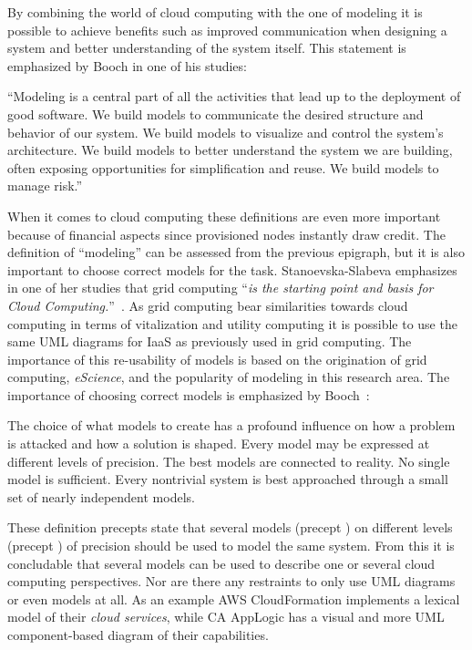 By combining the world of cloud computing with the one of modeling 
it is possible to achieve benefits such as improved communication when designing 
a system and better understanding of the system itself.
This statement is emphasized by Booch \etal in one of his studies:
\epigraph{
  ``Modeling is a central
  part of all the activities that lead up to the deployment of good
  software. We build models to communicate the desired structure and
  behavior of our system. We build models to visualize and control the
  system's architecture. We build models to better understand the
  system we are building, often exposing opportunities for
  simplification and reuse. We build models to manage risk.''
}{}
When it comes to cloud computing these definitions are even more important
because of financial aspects since provisioned nodes instantly draw credit.
The definition of ``modeling'' can be assessed from the previous epigraph, but it is 
also important to choose correct models for the task.
Stanoevska-Slabeva emphasizes in one of her studies that grid computing
``\emph{is the starting point and basis for Cloud Computing.}''~\cite{introduction:wozniak10}.
As grid computing bear similarities towards cloud computing in terms of vitalization and utility computing
it is possible to use the same UML diagrams for IaaS as previously used in grid computing.
The importance of this re-usability of models is based on the origination of grid computing, \emph{eScience},
and the popularity of modeling in this research area.
The importance of choosing correct models is emphasized by Booch~\cite{unified:booch05}:
\epigraph{
  \begin{ii}\iitem The choice
  of what models to create has a profound influence on how a problem
  is attacked and how a solution is shaped. \iitem Every model may be
  expressed at different levels of precision. \iitem The best models
  are connected to reality. \iitem No single model is
  sufficient. Every nontrivial system is best approached through a
  small set of nearly independent models.\end{ii}
}{}
These definition precepts state that several models (precept ) on different levels (precept ) 
of precision should be used to model the same system.
From this it is concludable that several models can be used to describe one or several cloud computing perspectives.
Nor are there any restraints to only use UML diagrams or even models at all.
As an example AWS CloudFormation implements a lexical model of their \emph{cloud services},
while CA AppLogic has a visual and more UML component-based diagram of their capabilities.


